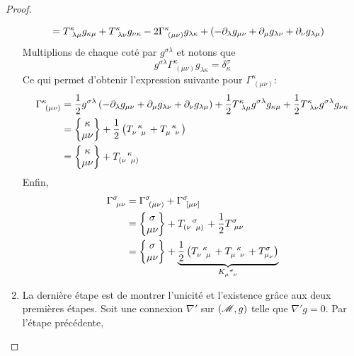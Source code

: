 \documentclass[a4paper,11pt]{report}
\begin{document}
\begin{proof}
\begin{enumerate}[label = \textit{\roman*)}]
\begin{align}
                                 &= T^\kappa_{~\lambda\mu}g_{\kappa\mu}+T^\kappa_{~\lambda\nu}g_{\nu\kappa}-2\Gamma^\kappa_{~(\mu\nu)}g_{\lambda\kappa} + \left( -\partial_\lambda g_{\mu\nu}+\partial_\mu g_{\lambda\nu} + \partial_\nu g_{\lambda\mu}\right)
                            \end{align}
                            Multiplions de chaque coté par $g^{\sigma\lambda}$ et notons que
                            \begin{equation} g^{\sigma\lambda}\Gamma^\kappa_{~(\mu\nu)}g_{\lambda\kappa} = \delta^\sigma_\kappa
                            \end{equation}
                            Ce qui permet d'obtenir l'expression suivante pour $\Gamma^\kappa_{~(\mu\nu)}$:
                            \begin{align}
                                \Gamma^\kappa_{~(\mu\nu)} &= \frac{1}{2}g^{\sigma\lambda}\left( -\p_\lambda g_{\mu\nu}+\p_\mu g_{\lambda\nu} + \p_\nu g_{\lambda\mu}\right)+\frac{1}{2}T^\kappa_{~\lambda\mu}g^{\sigma\lambda}g_{\kappa\mu}+\frac{1}{2}T^\kappa_{~\lambda\nu}g^{\sigma\lambda}g_{\nu\kappa}\\
                                &= \chris{\kappa}{\mu}{\nu}+\frac{1}{2}\left( T\indices{_\nu^\kappa_\mu}+T\indices{_\mu^\kappa_\nu} \right)\\
                                &= \chris{\kappa}{\mu}{\nu} + T\indices{_{(\nu}^\kappa_{\mu)}}
                            \end{align}
                            Enfin,
                            \begin{align}
                                 \Gamma^\sigma_{~\mu\nu} &=  \Gamma^\sigma_{~(\mu\nu)}+ \Gamma^\sigma_{~[\mu\nu]}\\
                                 &= \chris{\sigma}{\mu}{\nu} + T\indices{_{(\nu}^\sigma_{\mu)}} + \frac{1}{2}T^\sigma_{~\mu\nu}\\
                                 &=  \chris{\sigma}{\mu}{\nu}+\underbrace{\frac{1}{2}\left( T\indices{_\nu^\kappa_\mu}+T\indices{_\mu^\kappa_\nu} +T^\sigma_{\mu_\nu}\right)}_{K\indices{_\mu^\sigma_\nu}}
                            \end{align}
                        \item La dernière étape est de montrer l'unicité et l'existence grâce aux deux premières étapes. Soit une connexion $\nabla'$ sur $(\mathscr{M},g)$ telle que $\nabla'g = 0$. Par l'étape précédente,
                        \begin{equation}

\end{equation}
\end{enumerate}
\end{proof}
\end{document}

